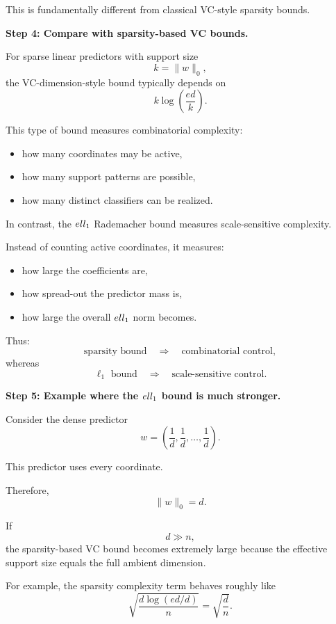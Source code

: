 \documentclass[11pt]{article}
\begin{document}
\begin{enumerate}
\begin{solutionbox}
This is fundamentally different from classical VC-style sparsity bounds.

\medskip

\textbf{Step 4: Compare with sparsity-based VC bounds.}

For sparse linear predictors with support size
\[
k=\|w\|_0,
\]
the VC-dimension-style bound typically depends on
\[
k\log\left(\frac{ed}{k}\right).
\]

This type of bound measures combinatorial complexity:
\begin{itemize}
    \item how many coordinates may be active,
    \item how many support patterns are possible,
    \item how many distinct classifiers can be realized.
\end{itemize}

In contrast, the $\\ell_1$ Rademacher bound measures scale-sensitive complexity.

Instead of counting active coordinates, it measures:
\begin{itemize}
    \item how large the coefficients are,
    \item how spread-out the predictor mass is,
    \item how large the overall $\\ell_1$ norm becomes.
\end{itemize}

Thus:
\[
\text{sparsity bound}
\quad\Longrightarrow\quad
\text{combinatorial control},
\]
whereas
\[
\ell_1\text{ bound}
\quad\Longrightarrow\quad
\text{scale-sensitive control}.
\]

\medskip

\textbf{Step 5: Example where the $\\ell_1$ bound is much stronger.}

Consider the dense predictor
\[
w
=
\left(
\frac1d,
\frac1d,
\ldots,
\frac1d
\right).
\]

This predictor uses every coordinate.

Therefore,
\[
\|w\|_0=d.
\]

If
\[
d\gg n,
\]
the sparsity-based VC bound becomes extremely large because the effective support size equals the full ambient dimension.

For example, the sparsity complexity term behaves roughly like
\[
\sqrt{
\frac{
d\log(ed/d)
}{n}
}
=
\sqrt{
\frac{d}{n}
}.
\]


\end{solutionbox}
\end{enumerate}
\end{document}
